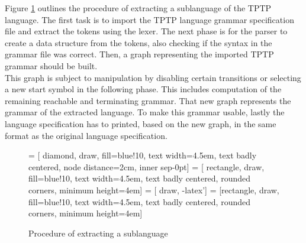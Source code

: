 Figure \ref{fig:ConceptProcessSublanguage} outlines the procedure of extracting a sublanguage of the \ac{TPTP} language.
The first task is to import the \ac{TPTP} language grammar specification file and extract the tokens using the lexer.
The next phase is for the parser to create a data structure from the tokens, also checking if the syntax in the grammar file was correct.
Then, a graph representing the imported \ac{TPTP} grammar should be built.\\
This graph is subject to manipulation by disabling certain transitions or selecting a new start symbol in the following phase.
This includes computation of the remaining reachable and terminating grammar.
That new graph represents the grammar of the extracted language.
To make this grammar usable, lastly the language specification has to printed, based on the new graph, in the same format as the original language specification.
\begin{figure}[H]
 = [ diamond, draw, fill=blue!10, text width=4.5em, text badly centered, node distance=2cm, inner sep-0pt]  
 = [ rectangle, draw, fill=blue!10, text width=4.5em, text badly centered, rounded corners, minimum height=4em]  
 = [ draw, -latex']  
 = [rectangle, draw, fill=blue!10, text width=4.5em, text badly centered, rounded corners, minimum height=4em]  
\begin{center}
\end{center}
\caption{Procedure of extracting a sublanguage}
\label{fig:ConceptProcessSublanguage}
\end{figure}

